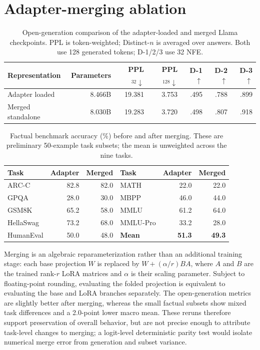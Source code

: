 \documentclass{article}
\begin{document}
\section{Adapter-merging ablation}
\label{app:merge}

\begin{table}[h]
\caption{Open-generation comparison of the adapter-loaded and merged Llama checkpoints. PPL is token-weighted; Distinct-$n$ is averaged over answers. Both use 128 generated tokens; D-1/2/3 use 32 NFE.}
\centering
\scriptsize
\begin{tabular}{lrrrrrr}
\toprule
Representation & Parameters & PPL$_{32}\downarrow$ & PPL$_{128}\downarrow$ & D-1$\uparrow$ & D-2$\uparrow$ & D-3$\uparrow$ \\
\midrule
Adapter loaded & 8.466B & 19.381 & 3.753 & .495 & .788 & .899 \\
Merged standalone & 8.030B & 19.283 & 3.720 & .498 & .807 & .918 \\
\bottomrule
\end{tabular}
\end{table}

\begin{table}[h]
\caption{Factual benchmark accuracy (\%) before and after merging. These are preliminary 50-example task subsets; the mean is unweighted across the nine tasks.}
\centering
\small
\begin{tabular}{lrr@{\qquad}lrr}
\toprule
Task & Adapter & Merged & Task & Adapter & Merged \\
\midrule
ARC-C      & 82.8 & 82.0 & MATH     & 22.0 & 22.0 \\
GPQA       & 28.0 & 30.0 & MBPP     & 46.0 & 44.0 \\
GSM8K      & 65.2 & 58.0 & MMLU     & 61.2 & 64.0 \\
HellaSwag  & 73.2 & 68.0 & MMLU-Pro & 33.2 & 28.0 \\
HumanEval  & 50.0 & 48.0 & \textbf{Mean} & \textbf{51.3} & \textbf{49.3} \\
\bottomrule
\end{tabular}
\end{table}

Merging is an algebraic reparameterization rather than an additional training stage: each base projection $W$ is replaced by $W+(\alpha/r)BA$, where $A$ and $B$ are the trained rank-$r$ LoRA matrices and $\alpha$ is their scaling parameter. Subject to floating-point rounding, evaluating the folded projection is equivalent to evaluating the base and LoRA branches separately. The open-generation metrics are slightly better after merging, whereas the small factual subsets show mixed task differences and a 2.0-point lower macro mean. These reruns therefore support preservation of overall behavior, but are not precise enough to attribute task-level changes to merging; a logit-level deterministic parity test would isolate numerical merge error from generation and subset variance.
\end{document}
